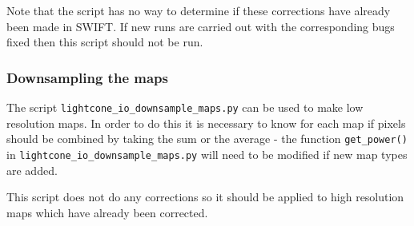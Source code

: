 \documentclass{article}
\begin{document}
Note that the script has no way to determine if these corrections have
already been made in SWIFT. If new runs are carried out with the
corresponding bugs fixed then this script should not be run.

\subsubsection{Downsampling the maps}

The script \verb|lightcone_io_downsample_maps.py| can be used to make
low resolution maps. In order to do this it is necessary to know for
each map if pixels should be combined by taking the sum or the average
- the function \verb|get_power()| in
\verb|lightcone_io_downsample_maps.py| will need to be modified if new
map types are added.

This script does not do any corrections so it should be applied to
high resolution maps which have already been corrected.

%
\end{document}
